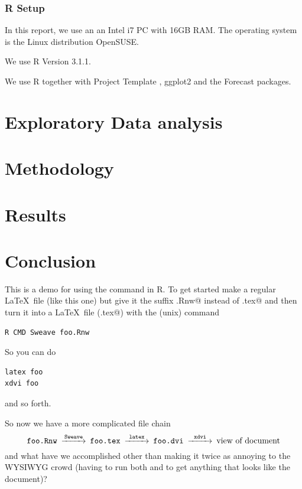 \documentclass{article}
\begin{document}
\subsubsection{R Setup}


In this report, we use an an Intel i7 PC with 16GB RAM. The operating system is the Linux distribution OpenSUSE. 

We use R \cite{RProj} Version 3.1.1.

We use R together with Project Template \cite{ProjectTemplate2014}, ggplot2 \cite{hwggplot} and the Forecast \cite{forcastpackage} packages.

\section{Exploratory Data analysis}
\section{Methodology}
\section{Results}
\section{Conclusion}

This is a demo for using the \verb@Sweave@ command in R.  To
get started make a regular \LaTeX\ file (like this one) but
give it the suffix \verb@.Rnw@ instead of \verb@.tex@ and then
turn it into a \LaTeX\ file (\verb@foo.tex@) with the (unix) command
\begin{verbatim}
R CMD Sweave foo.Rnw
\end{verbatim}
So you can do
\begin{verbatim}
latex foo
xdvi foo
\end{verbatim}
and so forth.

So now we have a more complicated file chain
$$
\begin{CD}
   \texttt{foo.Rnw}
   @>\texttt{Sweave}>>
   \texttt{foo.tex}
   @>\texttt{latex}>>
   \texttt{foo.dvi}
   @>\texttt{xdvi}>>
   \text{view of document}
\end{CD}
$$
and what have we accomplished other than making it twice as annoying
to the WYSIWYG crowd (having to run both \verb@Sweave@ and \verb@latex@
to get anything that looks like the document)?
\end{document}
